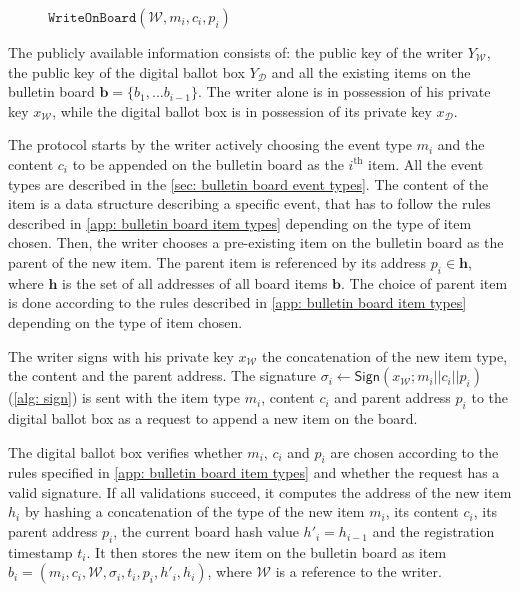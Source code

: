 \begin{figure}[ht]
    \renewcommand\figurename{Protocol}
    \caption{$\mathtt{WriteOnBoard}(\mathcal{W}, m_i, c_i, p_i)$}
    \label{pro: write on board}
\end{figure}

The publicly available information consists of: the public key of the writer $Y_\mathcal{W}$, the public key of the digital ballot box $Y_\mathcal{D}$ and all the existing items on the bulletin board $\boldsymbol{b} = \{b_1, ... b_{i-1}\}$. The writer alone is in possession of his private key $x_\mathcal{W}$, while the digital ballot box is in possession of its private key $x_\mathcal{D}$.

The protocol starts by the writer actively choosing the event type $m_i$ and the content $c_i$ to be appended on the bulletin board as the $i^\mathrm{th}$ item. All the event types are described in the \cref{sec: bulletin board event types}. The content of the item is a data structure describing a specific event, that has to follow the rules described in \cref{app: bulletin board item types} depending on the type of item chosen. Then, the writer chooses a pre-existing item on the bulletin board as the parent of the new item. The parent item is referenced by its address $p_i \in \boldsymbol{h}$, where $\boldsymbol{h}$ is the set of all addresses of all board items $\boldsymbol{b}$. The choice of parent item is done according to the rules described in \cref{app: bulletin board item types} depending on the type of item chosen.

The writer signs with his private key $x_\mathcal{W}$ the concatenation of the new item type, the content and the parent address. The signature $\sigma_i \gets \mathsf{Sign}(x_\mathcal{W}; m_i || c_i || p_i)$ (\cref{alg: sign}) is sent with the item type $m_i$, content $c_i$ and parent address $p_i$ to the digital ballot box as a request to append a new item on the board.

The digital ballot box verifies whether $m_i$, $c_i$ and $p_i$ are chosen according to the rules specified in \cref{app: bulletin board item types} and whether the request has a valid signature. If all validations succeed, it computes the address of the new item $h_i$ by hashing a concatenation of the type of the new item $m_i$, its content $c_i$, its parent address $p_i$, the current board hash value $h'_i = h_{i-1}$ and the registration timestamp $t_i$. It then stores the new item on the bulletin board as item $b_i = (m_i, c_i, \mathcal{W}, \sigma_i, t_i, p_i, h'_i, h_i)$, where $\mathcal{W}$ is a reference to the writer.

